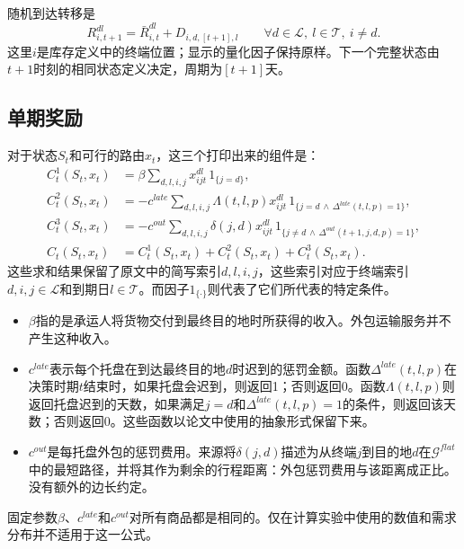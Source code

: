 \documentclass{article}
\begin{document}
随机到达转移是
\begin{equation}
R_{i,t+1}^{dl}=\bar R_{i,t}^{dl}+D_{i,d,[t+1],l}
\qquad\forall d\in\mathcal{L},\ l\in\mathcal{T},\ i\ne d.
\tag{3}
\end{equation}
这里$i$是库存定义中的终端位置；显示的量化因子保持原样。下一个完整状态由$t+1$时刻的相同状态定义决定，周期为$[t+1]$天。

\subsection*{单期奖励}
对于状态$S_t$和可行的路由$x_t$，这三个打印出来的组件是：
\begin{align*}
C_t^1(S_t,x_t)
&=\beta\sum_{d,l,i,j}x_{ijt}^{dl}\,1_{\{j=d\}},\\
C_t^2(S_t,x_t)
&=-c^{late}\sum_{d,l,i,j}\Lambda(t,l,p)x_{ijt}^{dl}
\,1_{\{j=d\,\wedge\,\Delta^{late}(t,l,p)=1\}},\\
C_t^3(S_t,x_t)
&=-c^{out}\sum_{d,l,i,j}\delta(j,d)x_{ijt}^{dl}
\,1_{\{j\ne d\,\wedge\,\Delta^{out}(t+1,j,d,p)=1\}},\\
C_t(S_t,x_t)
&=C_t^1(S_t,x_t)+C_t^2(S_t,x_t)+C_t^3(S_t,x_t).
\end{align*}
这些求和结果保留了原文中的简写索引$d,l,i,j$，这些索引对应于终端索引$d,i,j\in\mathcal{L}$和到期日$l\in\mathcal{T}$。而因子$1_{\{\cdot\}}$则代表了它们所代表的特定条件。

\begin{itemize}
\item $\beta$指的是承运人将货物交付到最终目的地时所获得的收入。外包运输服务并不产生这种收入。
\item $c^{late}$表示每个托盘在到达最终目的地$d$时迟到的惩罚金额。函数$\Delta^{late}(t,l,p)$在决策时期$t$结束时，如果托盘会迟到，则返回1；否则返回0。函数$\Lambda(t,l,p)$则返回托盘迟到的天数，如果满足$j=d$和$\Delta^{late}(t,l,p)=1$的条件，则返回该天数；否则返回0。这些函数以论文中使用的抽象形式保留下来。
\item $c^{out}$是每托盘外包的惩罚费用。来源将$\delta(j,d)$描述为从终端$j$到目的地$d$在$\mathcal{G}^{flat}$中的最短路径，并将其作为剩余的行程距离：外包惩罚费用与该距离成正比。没有额外的边长约定。
\end{itemize}
固定参数$\beta$、$c^{late}$和$c^{out}$对所有商品都是相同的。仅在计算实验中使用的数值和需求分布并不适用于这一公式。
\end{document}
